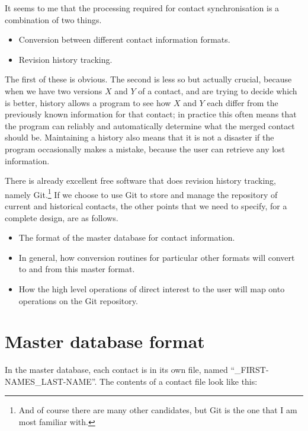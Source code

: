 \documentclass{article}
\begin{document}
It seems to me that the processing required for contact
synchronisation is a combination of two things.

\begin{itemize}

\item Conversion between different contact information formats.

\item Revision history tracking.

\end{itemize}

The first of these is obvious.  The second is less so but actually
crucial, because when we have two versions $X$ and $Y$ of a contact,
and are trying to decide which is better, history allows a program to
see how $X$ and $Y$ each differ from the previously known information
for that contact; in practice this often means that the program can
reliably and automatically determine what the merged contact should
be.  Maintaining a history also means that it is not a disaster if the
program occasionally makes a mistake, because the user can retrieve
any lost information.

There is already excellent free software that does revision history
tracking, namely Git.\footnote{And of course there are many other
  candidates, but Git is the one that I am most familiar with.}  If we
choose to use Git to store and manage the repository of current and
historical contacts, the other points that we need to specify, for a
complete design, are as follows.

\begin{itemize}

\item The format of the master database for contact information.

\item In general, how conversion routines for particular other formats
  will convert to and from this master format.

\item How the high level operations of direct interest to the user
  will map onto operations on the Git repository.

\end{itemize}

\section{Master database format}

In the master database, each contact is in its own file, named
``\_FIRST-NAMES\_LAST-NAME''.  The contents of a contact file look like
this:
\end{document}
